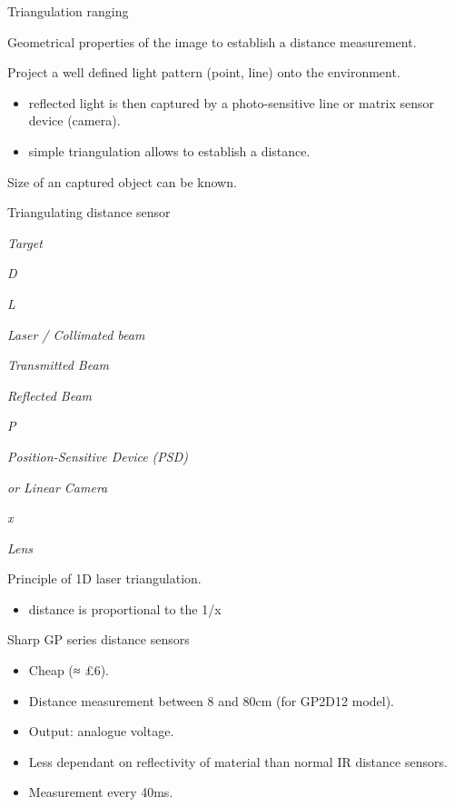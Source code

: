 \documentclass[compress]{beamer}
\providecommand{\tightlist}{%
  \setlength{\itemsep}{0pt}\setlength{\parskip}{0pt}}
\begin{document}
\begin{frame}{Triangulation ranging}

Geometrical properties of the image to establish a distance measurement.

Project a well defined light pattern (\eg point, line) onto the
environment.

\begin{itemize}
\tightlist
\item
  reflected light is then captured by a photo-sensitive line or matrix
  sensor device (camera).
\item
  simple triangulation allows to establish a distance.
\end{itemize}

Size of an captured object can be known.

\end{frame}

\begin{frame}{Triangulating distance sensor}

\emph{Target}

\emph{D}

\emph{L}

\emph{Laser / Collimated beam}

\emph{Transmitted Beam}

\emph{Reflected Beam}

\emph{P}

\emph{Position-Sensitive Device (PSD)}

\emph{or Linear Camera}

\emph{x}

\emph{Lens}

Principle of 1D laser triangulation.

\begin{itemize}
\tightlist
\item
  distance is proportional to the 1/x
\end{itemize}

\end{frame}

\begin{frame}{Sharp GP series distance sensors}

\begin{itemize}
\tightlist
\item
  Cheap (≈ £6).
\item
  Distance measurement between 8 and 80cm (for GP2D12 model).
\item
  Output: analogue voltage.
\item
  Less dependant on reflectivity of material than normal IR distance
  sensors.
\item
  Measurement every 40ms.
\end{itemize}

\end{frame}
\end{document}
